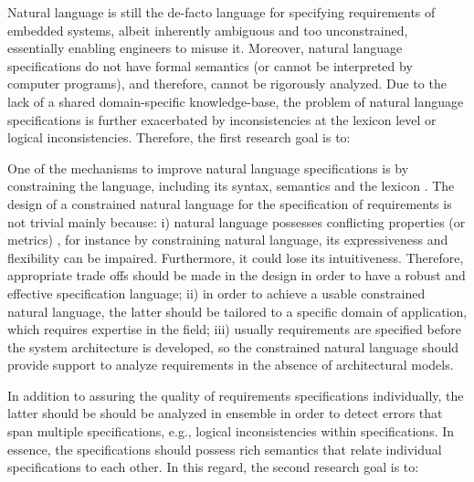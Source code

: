 Natural language is still the de-facto language for specifying requirements of embedded systems, albeit inherently ambiguous and too unconstrained, essentially enabling engineers to misuse it. Moreover, natural language specifications do not have formal semantics (or cannot be interpreted by computer programs), and therefore, cannot be rigorously analyzed. Due to the lack of a shared domain-specific knowledge-base, the problem of natural language specifications is further exacerbated by inconsistencies at the lexicon level or logical inconsistencies.  Therefore, the first research goal is to:
\begin{researchgoal}
\end{researchgoal}

One of the mechanisms to improve natural language specifications is by constraining the language, including its syntax, semantics and the lexicon \cite{Kuhn2014ALanguages}. The design of a constrained natural language for the specification of requirements is not trivial mainly because: i) natural language possesses conflicting properties (or metrics) \cite{ieereqspecstandard}, for instance by constraining natural language, its expressiveness and flexibility \cite{Myachykov2013SyntacticRussian} can be impaired. Furthermore, it could lose its intuitiveness. Therefore, appropriate trade offs should be made in the design in order to have a robust and effective specification language; ii) in order to achieve a usable constrained natural language, the latter should be tailored to a specific domain of application, which requires expertise in the field; iii) usually requirements are specified before the system architecture is developed, so the constrained natural language should provide support to analyze requirements in the absence of architectural models.

In addition to assuring the quality of requirements specifications individually, the latter should be should be analyzed in ensemble in order to detect errors that span multiple specifications, e.g., logical inconsistencies within specifications. In essence, the specifications should possess rich semantics that relate individual specifications to each other. In this regard, the second research goal is to:

\begin{researchgoal}
\end{researchgoal}

